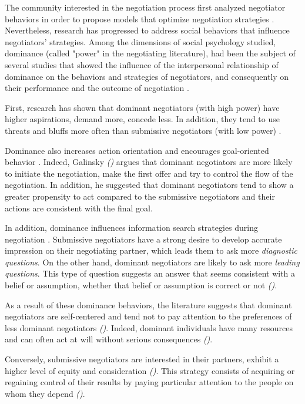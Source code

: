 \documentclass[10pt, a4paper]{article} %
\begin{document}
			The community interested in the negotiation process first analyzed negotiator behaviors in order to propose models that optimize negotiation strategies \cite{thompson2010negotiation}.
			Nevertheless, research has progressed to address  social behaviors that influence negotiators' strategies. 
			Among the dimensions of social psychology studied, dominance (called "power" in the negotiating literature), had been the subject of several studies that showed the influence of the interpersonal relationship of dominance on the behaviors and strategies of negotiators, and consequently on their performance and the outcome of negotiation \cite{de1995impact,van2006power}.
			
			First, research has shown that dominant negotiators (with high power) have higher aspirations, demand more, concede less. In addition, they tend to use threats and bluffs more often than submissive negotiators (with low power) \cite{de1995impact}.
			
			Dominance also increases action orientation and encourages goal-oriented behavior \cite{van2006power}. Indeed, Galinsky  \emph{(\cite{Galinsky2003power})} argues that dominant negotiators are more likely to initiate the negotiation, make the first offer and try to control the flow of the negotiation. 
			In addition, he suggested that dominant negotiators tend to show a greater propensity to act compared to the submissive negotiators and their actions are consistent with the final goal.
			
			In addition, dominance influences information search strategies during negotiation \cite{de2004influence}. Submissive negotiators have a strong desire to develop accurate impression on their negotiating partner, which leads them to ask more \emph{diagnostic questions}.
			On the other hand, dominant negotiators are likely to ask more \emph{leading questions}. This type of question suggests an answer that seems consistent with a belief or assumption, whether that belief or assumption is correct or not \emph{(\cite{Galinsky2003power})}.
			
			As a result of these dominance behaviors, the literature suggests that dominant negotiators are self-centered and tend not to pay attention to the preferences of less dominant negotiators \emph{(\cite{fiske1993controlling, de1995impact})}. Indeed, dominant individuals have many resources and can often act at will without serious consequences \emph{(\cite{van2006power})}. 
			
			Conversely, submissive negotiators are interested in their partners, exhibit a higher level of equity and consideration \emph{(\cite{de1995impact})}. This strategy consists of acquiring or regaining control of their results by paying particular attention to the people on whom they depend \emph{(\cite{fiske1993controlling})}.
			
\end{document}
